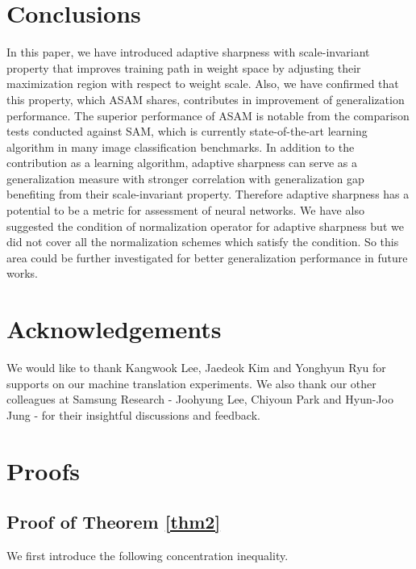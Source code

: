 \documentclass{article}
\begin{document}
\ificml
\else
    \clearpage
\fi

\section{Conclusions}\label{sec:c}
In this paper, we have introduced adaptive sharpness with scale-invariant property that improves training path in weight space by adjusting their maximization region with respect to weight scale. Also, we have confirmed that this property, which ASAM shares, contributes in improvement of generalization performance. The superior performance of ASAM is notable from the comparison tests conducted against SAM, which is currently state-of-the-art learning algorithm in many image classification benchmarks. In addition to the contribution as a learning algorithm, adaptive sharpness can serve as a generalization measure with stronger correlation with generalization gap benefiting from their scale-invariant property. Therefore adaptive sharpness has a potential to be a metric for assessment of neural networks. We have also suggested the condition of normalization operator for adaptive sharpness but we did not cover all the normalization schemes which satisfy the condition. So this area could be further investigated for better generalization performance in future works. 

\section{Acknowledgements}
We would like to thank Kangwook Lee, Jaedeok Kim and Yonghyun Ryu for supports on our machine translation experiments. We also thank our other colleagues at Samsung Research - Joohyung Lee, Chiyoun Park and Hyun-Joo Jung - for their insightful discussions and feedback.

\ificml
\else
    \clearpage
\fi






\appendix
\onecolumn
\section{Proofs}

\subsection{Proof of Theorem \ref{thm2}} \label{app1}

We first introduce the following concentration inequality.
\end{document}
